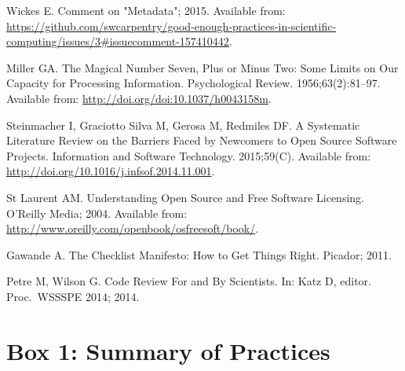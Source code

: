 \documentclass[10pt,letterpaper]{article}
\begin{document}
\begin{thebibliography}{10}
Wickes E. Comment on "Metadata"; 2015.
\newblock Available from:
  \url{https://github.com/swcarpentry/good-enough-practices-in-scientific-computing/issues/3\#issuecomment-157410442}.

Miller GA.
\newblock The Magical Number Seven, Plus or Minus Two: Some Limits on Our
  Capacity for Processing Information.
\newblock Psychological Review. 1956;63(2):81–97.
\newblock Available from:
  \url{http://doi.org/doi:10.1037/h0043158m}.

Steinmacher I, {Graciotto Silva} M, Gerosa M, Redmiles DF.
\newblock A Systematic Literature Review on the Barriers Faced by Newcomers to
  Open Source Software Projects.
\newblock Information and Software Technology. 2015;59(C).
\newblock Available from:
  \url{http://doi.org/10.1016/j.infsof.2014.11.001}.

{St  Laurent} AM.
\newblock Understanding Open Source and Free Software Licensing.
\newblock O'Reilly Media; 2004.
\newblock Available from:
  \url{http://www.oreilly.com/openbook/osfreesoft/book/}.

Gawande A.
\newblock The Checklist Manifesto: How to Get Things Right.
\newblock Picador; 2011.

Petre M, Wilson G.
\newblock Code Review For and By Scientists.
\newblock In: Katz D, editor. Proc.\ WSSSPE 2014; 2014.

\end{thebibliography}

\pagebreak

\section*{Box 1: Summary of Practices}
\end{document}
